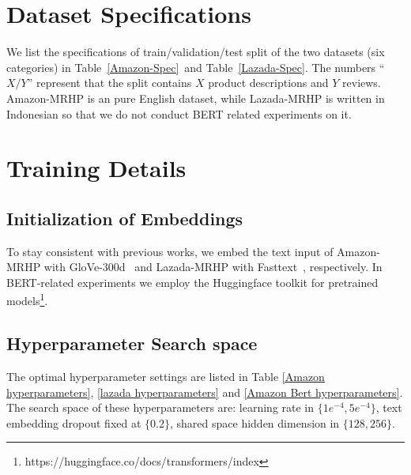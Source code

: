 \appendix

\section{Dataset Specifications}
We list the specifications of train/validation/test split of the two datasets (six categories) in Table~\ref{Amazon-Spec}~and Table~\ref{Lazada-Spec}.
The numbers ``$X/Y$'' represent that the split contains $X$ product descriptions and $Y$ reviews.
Amazon-MRHP is an pure English dataset, while Lazada-MRHP is written in Indonesian so that we do not conduct BERT related experiments on it.


\section{Training Details}
\subsection{Initialization of Embeddings}
To stay consistent with previous works, we embed the text input of Amazon-MRHP with GloVe-300d~\cite{pennington2014glove} and Lazada-MRHP with  Fasttext~\cite{joulin2016fasttext}, respectively.
In BERT-related experiments we employ the Huggingface toolkit for pretrained models\footnote{https://huggingface.co/docs/transformers/index}.

\subsection{Hyperparameter Search space}
The optimal hyperparameter settings are listed in Table \ref{Amazon hyperparameters}, \ref{lazada hyperparameters} and \ref{Amazon Bert hyperparameters}.
The search space of these hyperparameters are: learning rate in $\{1e^{-4}, 5e^{-4}\}$, text embedding dropout fixed at $\{0.2\}$, shared space hidden dimension in $\{128, 256\}$.



\label{sec:appendix}


